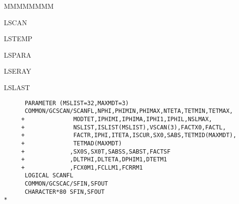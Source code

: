 \begin{DLtt}{MMMMMMMM}
\item[LSCAN]
\item[LSTEMP]
\item[LSPARA]
\item[LSERAY]
\item[LSLAST]
\end{DLtt}
\begin{verbatim}
      PARAMETER (MSLIST=32,MAXMDT=3)
      COMMON/GCSCAN/SCANFL,NPHI,PHIMIN,PHIMAX,NTETA,TETMIN,TETMAX,
     +              MODTET,IPHIMI,IPHIMA,IPHI1,IPHIL,NSLMAX,
     +              NSLIST,ISLIST(MSLIST),VSCAN(3),FACTX0,FACTL,
     +              FACTR,IPHI,ITETA,ISCUR,SX0,SABS,TETMID(MAXMDT),
     +              TETMAD(MAXMDT)
     +             ,SX0S,SX0T,SABSS,SABST,FACTSF
     +             ,DLTPHI,DLTETA,DPHIM1,DTETM1
     +             ,FCX0M1,FCLLM1,FCRRM1
      LOGICAL SCANFL
      COMMON/GCSCAC/SFIN,SFOUT
      CHARACTER*80 SFIN,SFOUT
*
\end{verbatim}
